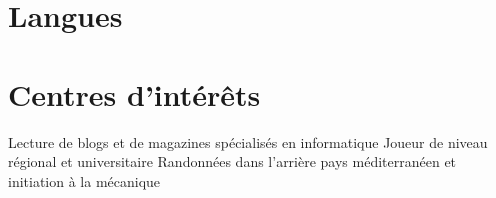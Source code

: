 \documentclass[10pt,a4paper,roman]{moderncv} %
\begin{document}




	\section{Langues}



	\section{Centres d'intérêts}

	\renewcommand{\listitemsymbol}{-~} %

	 {Lecture de blogs et de magazines spécialisés en informatique}
         {Joueur de niveau régional et universitaire}
	 {Randonnées dans l'arrière pays méditerranéen et initiation à la mécanique}


\clearpage
\end{document}
